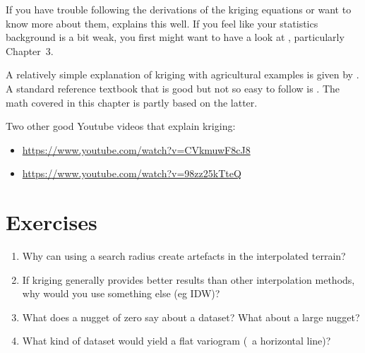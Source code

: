 If you have trouble following the derivations of the kriging equations or want to know more about them, \citet{Lichtenstern13} explains this well.
If you feel like your statistics background is a bit weak, you first might want to have a look at \citet{Fewster14}, particularly Chapter~3.

A relatively simple explanation of kriging with agricultural examples is given by \citet{Oliver15}.
A standard reference textbook that is good but not so easy to follow is \citet{Wackernagel03}.
The math covered in this chapter is partly based on the latter.

Two other good Youtube videos that explain kriging:
\begin{itemize}
\item \url{https://www.youtube.com/watch?v=CVkmuwF8cJ8}
\item \url{https://www.youtube.com/watch?v=98zz25kTteQ}
\end{itemize}

%
\section{Exercises}

\begin{enumerate}
\item Why can using a search radius create artefacts in the interpolated terrain?
\item If kriging generally provides better results than other interpolation methods, why would you use something else (eg IDW)?
\item What does a nugget of zero say about a dataset? What about a large nugget?
\item What kind of dataset would yield a flat variogram (\ie\ a horizontal line)?
\end{enumerate}
